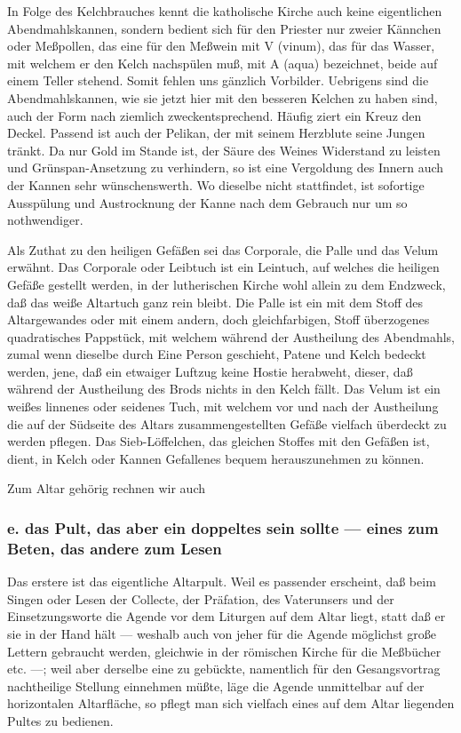 In Folge des Kelchbrauches kennt die katholische Kirche auch keine eigentlichen Abendmahlskannen, sondern bedient sich für den Priester nur zweier Kännchen oder Meßpollen, das eine für den Meßwein mit V (vinum), das für das Wasser, mit welchem er den Kelch nachspülen muß, mit A (aqua) bezeichnet, beide auf einem Teller stehend. Somit fehlen uns gänzlich Vorbilder. Uebrigens sind die Abendmahlskannen, wie sie jetzt hier mit den besseren Kelchen zu haben sind, auch der Form nach ziemlich zweckentsprechend. Häufig ziert ein Kreuz den Deckel. Passend ist auch der Pelikan, der mit seinem Herzblute seine Jungen tränkt. Da nur Gold im Stande ist, der Säure des Weines Widerstand zu leisten und Grünspan-Ansetzung zu verhindern, so ist eine Vergoldung des Innern auch der Kannen sehr wünschenswerth. Wo dieselbe nicht stattfindet, ist sofortige Ausspülung und Austrocknung der Kanne nach dem Gebrauch nur um so nothwendiger.

Als Zuthat zu den heiligen Gefäßen sei das Corporale, die Palle und das Velum erwähnt. Das Corporale oder Leibtuch ist ein Leintuch, auf welches die heiligen Gefäße gestellt werden, in der lutherischen Kirche wohl allein zu dem Endzweck, daß das weiße Altartuch ganz rein bleibt. Die Palle ist ein mit dem Stoff des Altargewandes oder mit einem andern, doch gleichfarbigen, Stoff überzogenes quadratisches Pappstück, mit welchem während der Austheilung des Abendmahls, zumal wenn dieselbe durch Eine Person geschieht, Patene und Kelch bedeckt werden, jene, daß ein etwaiger Luftzug keine Hostie herabweht, dieser, daß während der Austheilung des Brods nichts in den Kelch fällt. Das Velum ist ein weißes linnenes oder seidenes Tuch, mit welchem vor und nach der Austheilung die auf der Südseite des Altars zusammengestellten
Gefäße vielfach überdeckt zu werden pflegen. Das Sieb-Löffelchen, das gleichen Stoffes mit den Gefäßen ist, dient, in Kelch oder Kannen Gefallenes bequem herauszunehmen zu können.

Zum Altar gehörig rechnen wir auch

\subsubsection[e. das Pult]{e. das Pult, das aber ein doppeltes sein sollte — eines zum Beten, das andere zum Lesen}

Das erstere ist das eigentliche Altarpult. Weil es passender erscheint, daß beim Singen oder Lesen der Collecte, der Präfation, des Vaterunsers und der Einsetzungsworte die Agende vor dem Liturgen auf dem Altar liegt, statt daß er sie in der Hand hält — weshalb auch von jeher für die Agende möglichst große Lettern gebraucht werden, gleichwie in der römischen Kirche für die Meßbücher etc. —; weil aber derselbe eine zu gebückte, namentlich für den Gesangsvortrag nachtheilige Stellung einnehmen müßte, läge die Agende unmittelbar auf der horizontalen Altarfläche, so pflegt man sich vielfach eines auf dem Altar liegenden Pultes zu bedienen.

